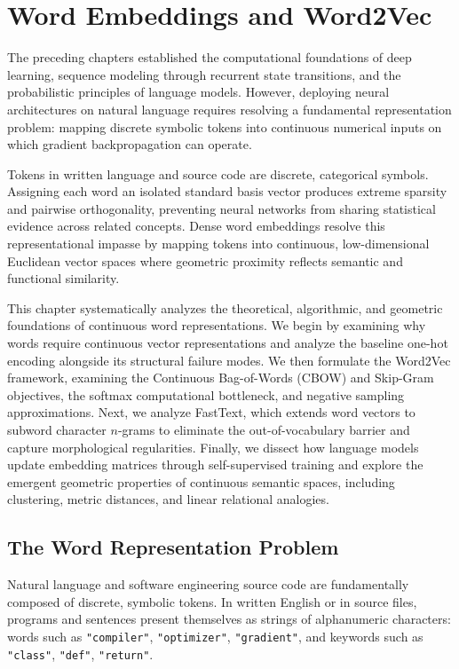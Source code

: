 \documentclass[../../../main.tex]{subfiles}
\begin{document}
\chapter{Word Embeddings and Word2Vec}
\label{ch:word_embeddings}

The preceding chapters established the computational foundations of deep learning, sequence modeling through recurrent state transitions, and the probabilistic principles of language models. However, deploying neural architectures on natural language requires resolving a fundamental representation problem: mapping discrete symbolic tokens into continuous numerical inputs on which gradient backpropagation can operate.

Tokens in written language and source code are discrete, categorical symbols. Assigning each word an isolated standard basis vector produces extreme sparsity and pairwise orthogonality, preventing neural networks from sharing statistical evidence across related concepts. Dense word embeddings resolve this representational impasse by mapping tokens into continuous, low-dimensional Euclidean vector spaces where geometric proximity reflects semantic and functional similarity.

This chapter systematically analyzes the theoretical, algorithmic, and geometric foundations of continuous word representations. We begin by examining why words require continuous vector representations and analyze the baseline one-hot encoding alongside its structural failure modes. We then formulate the Word2Vec framework, examining the Continuous Bag-of-Words (CBOW) and Skip-Gram objectives, the softmax computational bottleneck, and negative sampling approximations. Next, we analyze FastText, which extends word vectors to subword character $n$-grams to eliminate the out-of-vocabulary barrier and capture morphological regularities. Finally, we dissect how language models update embedding matrices through self-supervised training and explore the emergent geometric properties of continuous semantic spaces, including clustering, metric distances, and linear relational analogies.

\clearpage
\section{The Word Representation Problem}
\label{sec:representation_problem}

Natural language and software engineering source code are fundamentally composed of discrete, symbolic tokens. In written English or in source files, programs and sentences present themselves as strings of alphanumeric characters: words such as \texttt{"compiler"}, \texttt{"optimizer"}, \texttt{"gradient"}, and keywords such as \texttt{"class"}, \texttt{"def"}, \texttt{"return"}.
\end{document}
